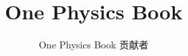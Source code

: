 \documentclass[11pt,a4paper,twoside,openany]{book}
\title{One Physics Book}
\author{One Physics Book 贡献者}
\date{\bookdate}
\begin{document}
\frontmatter



\tableofcontents

\mainmatter





\appendix
\part{\omsolutionspart}




\backmatter
\printindex
\end{document}
